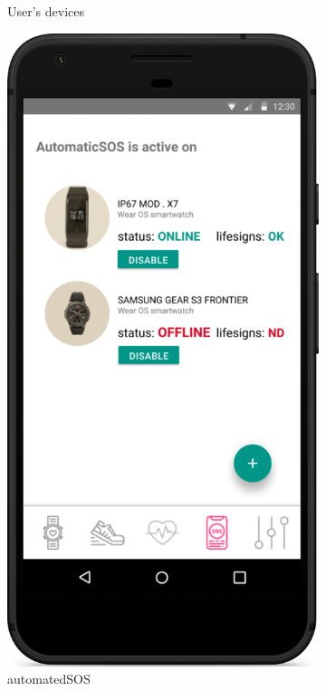 \documentclass[../main.tex]{subfiles}
\begin{document}
\begin{figure}[H]
\begin{subfigure}[b]{0.45\linewidth}
		\caption{User's devices}
		\label{mock_userDevices}
	\end{subfigure}
	\begin{subfigure}[b]{0.45\linewidth}
		\includegraphics[width=\linewidth]{images/mockup/AutomaticSOS.png}
		\caption{automatedSOS}
		\label{mock_automatedSOS}
	\end{subfigure}
	\caption{}
\end{figure}
\end{document}
